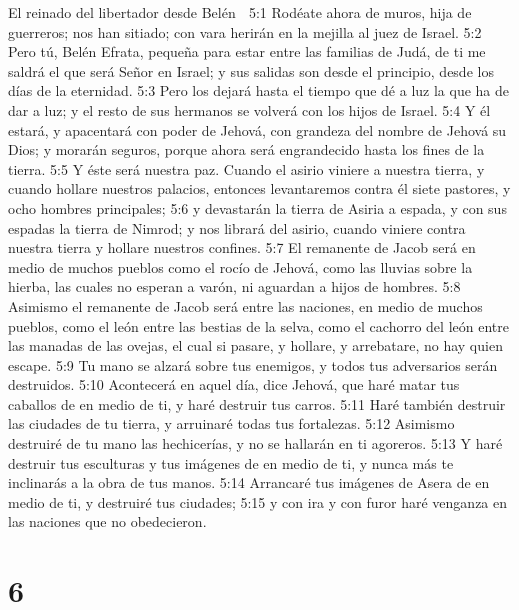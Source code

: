 El reinado del libertador desde Belén  

5:1 Rodéate ahora de muros, hija de guerreros; nos han sitiado; con vara herirán en la mejilla al juez de Israel.  
5:2 Pero tú, Belén Efrata, pequeña para estar entre las familias de Judá, de ti me saldrá el que será Señor en Israel;  y sus salidas son desde el principio, desde los días de la eternidad.  
5:3 Pero los dejará hasta el tiempo que dé a luz la que ha de dar a luz; y el resto de sus hermanos se volverá con los hijos de Israel.  
5:4 Y él estará, y apacentará con poder de Jehová, con grandeza del nombre de Jehová su Dios; y morarán seguros, porque ahora será engrandecido hasta los fines de la tierra.  
5:5 Y éste será nuestra paz. Cuando el asirio viniere a nuestra tierra, y cuando hollare nuestros palacios, entonces levantaremos contra él siete pastores, y ocho hombres principales;  
5:6 y devastarán la tierra de Asiria a espada, y con sus espadas la tierra de Nimrod; y nos librará del asirio, cuando viniere contra nuestra tierra y hollare nuestros confines.  
5:7 El remanente de Jacob será en medio de muchos pueblos como el rocío de Jehová, como las lluvias sobre la hierba, las cuales no esperan a varón, ni aguardan a hijos de hombres.  
5:8 Asimismo el remanente de Jacob será entre las naciones, en medio de muchos pueblos, como el león entre las bestias de la selva, como el cachorro del león entre las manadas de las ovejas, el cual si pasare, y hollare, y arrebatare, no hay quien escape.  
5:9 Tu mano se alzará sobre tus enemigos, y todos tus adversarios serán destruidos.  
5:10 Acontecerá en aquel día, dice Jehová, que haré matar tus caballos de en medio de ti, y haré destruir tus carros.  
5:11 Haré también destruir las ciudades de tu tierra, y arruinaré todas tus fortalezas.  
5:12 Asimismo destruiré de tu mano las hechicerías, y no se hallarán en ti agoreros.  
5:13 Y haré destruir tus esculturas y tus imágenes de en medio de ti, y nunca más te inclinarás a la obra de tus manos.  
5:14 Arrancaré tus imágenes de Asera de en medio de ti, y destruiré tus ciudades;  
5:15 y con ira y con furor haré venganza en las naciones que no obedecieron.  

\chapter{6}

